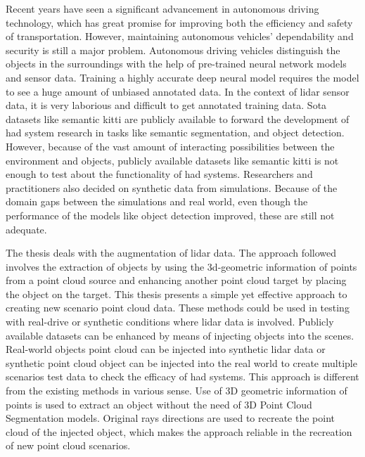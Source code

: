 Recent years have seen a significant advancement in autonomous driving technology, which has great promise for improving both the efficiency and safety of transportation. However, maintaining autonomous vehicles' dependability and security is still a major problem. Autonomous driving vehicles distinguish the objects in the surroundings with the help of pre-trained neural network models and sensor data. Training a highly accurate deep neural model requires the model to see a huge amount of unbiased annotated data. In the context of lidar sensor data, it is very laborious and difficult to get annotated training data. Sota datasets like semantic kitti are publicly available to forward the development of \acrfull{had} system research in tasks like semantic segmentation, and object detection. However, because of the vast amount of interacting possibilities between the environment and objects, publicly available datasets like semantic kitti is not enough to test about the functionality of \acrshort{had} systems. Researchers and practitioners also decided on synthetic data from simulations. Because of the domain gaps between the simulations and real world, even though the performance of the models like object detection improved, these are still not adequate.

The thesis deals with the augmentation of lidar data. The approach followed involves the extraction of objects by using the 3d-geometric information of points from a point cloud source and enhancing another point cloud target by placing the object on the target. This thesis presents a simple yet effective approach to creating new scenario point cloud data. These methods could be used in testing with real-drive or synthetic conditions where lidar data is involved. Publicly available datasets can be enhanced by means of injecting objects into the scenes. Real-world objects point cloud can be injected into synthetic lidar data or synthetic point cloud object can be injected into the real world to create multiple scenarios test data to check the efficacy of \acrshort{had} systems. This approach is different from the existing methods in various sense. Use of 3D geometric information of points is used to extract an object without the need of 3D Point Cloud Segmentation models. Original rays directions are used to recreate the point cloud of the injected object, which makes the approach reliable in the recreation of new point cloud scenarios.
